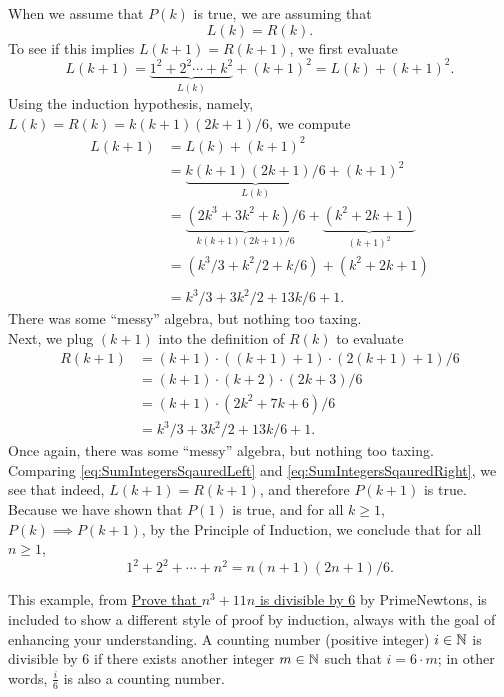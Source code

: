 When we assume that $P(k)$ is true, we are assuming that
$$
        L(k) = R(k). 
$$
To see if this implies $L(k+1) = R(k+1)$, we first evaluate  
 $$L(k+1)= \underbrace{1 ^2 +2^2 \cdots +k^2}_{L(k)} + (k+1)^2 = L(k) + (k+1)^2.$$
Using the induction hypothesis, namely, $L(k)=R(k)=k(k+1)(2 k + 1)/6$, we compute 
\begin{equation}
    \label{eq:SumIntegersSqauredLeft}
    \begin{aligned}
        L(k+1)&= L(k) + (k+1)^2 \\
        &= \underbrace{k(k+1)(2 k + 1)/6}_{L(k)} +  (k+1)^2  \\
        &= \underbrace{(2k^3+3k^2+k)/6}_{k(k+1)(2 k + 1)/6} +  \underbrace{(k^2+2k+1)}_{(k+1)^2} \\
        &= (k^3/3 + k^2/2 + k/6)+ (k^2+2k+1) \\
        \\
        &= k^3/3 + 3  k^2/2 + 13 k/6  + 1.
    \end{aligned}
\end{equation}
There was some ``messy'' algebra, but nothing too taxing.\\

Next, we plug $(k+1)$ into the definition of $R(k)$ to evaluate
\begin{equation}
    \label{eq:SumIntegersSqauredRight}
    \begin{aligned}
        R(k+1)&= (k+1)\cdot((k+1) + 1) \cdot (2(k+1) +1)/6  \\
        & = (k+1)\cdot(k+2) \cdot (2k+3)/6  \\
        &= (k+1) \cdot (2k^2 + 7k + 6)/6 \\
        &=  k^3/3 + 3k^2/2 + 13k/6 + 1.
    \end{aligned}
\end{equation}
Once again, there was some ``messy'' algebra, but nothing too taxing.\\

Comparing \eqref{eq:SumIntegersSqauredLeft} and \eqref{eq:SumIntegersSqauredRight}, we see that indeed, $L(k+1) = R(k+1)$, and therefore $P(k+1)$ is true. Because we have shown that $P(1)$ is true, and for all $k\ge 1$, $P(k) \implies P(k+1)$, by the Principle of Induction, we conclude that for all $n\ge 1$,
$$ 1^2+2^2 +  \cdots + n^2 = n(n + 1)(2n + 1) / 6.$$
\Qed
\bigskip

This example, from \href{https://youtu.be/kLET3c9qRgo}{Prove that $n^3 +11n$ is divisible by 6} by PrimeNewtons, is included to show a different style of proof by induction, always with the goal of enhancing your understanding. A counting number (positive integer) $i \in \mathbb N$ is divisible by 6 if there exists another integer $m \in \mathbb N$ such that $i = 6 \cdot m$; in other words, $\frac{i}{6}$ is also a counting number.

